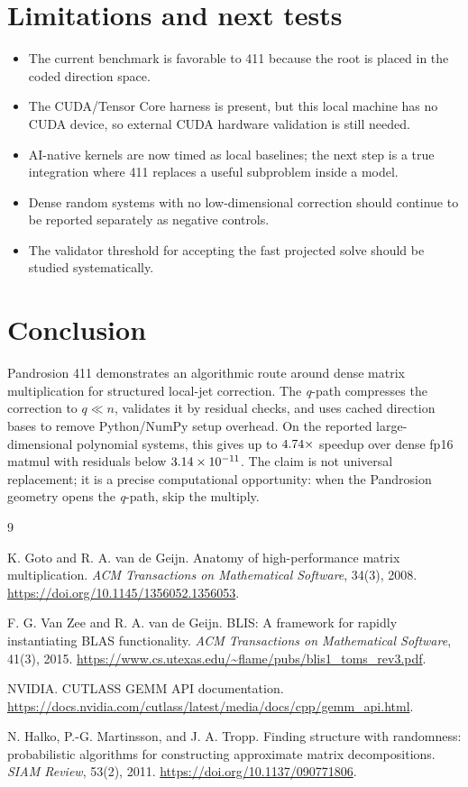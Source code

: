 \documentclass[11pt]{article}
\newcommand{\qpath}{\textit{q}\nobreakdash-path}
\begin{document}
\section{Limitations and next tests}

\begin{itemize}[leftmargin=1.2em]
\item The current benchmark is favorable to 411 because the root is placed in
the coded direction space.
\item The CUDA/Tensor Core harness is present, but this local machine has no
CUDA device, so external CUDA hardware validation is still needed.
\item AI-native kernels are now timed as local baselines; the next step is a
true integration where 411 replaces a useful subproblem inside a model.
\item Dense random systems with no low-dimensional correction should continue
to be reported separately as negative controls.
\item The validator threshold for accepting the fast projected solve should be
studied systematically.
\end{itemize}

\section{Conclusion}

Pandrosion 411 demonstrates an algorithmic route around dense matrix
multiplication for structured local-jet correction.  The \qpath{} compresses the
correction to \(q\ll n\), validates it by residual checks, and uses cached
direction bases to remove Python/NumPy setup overhead.  On the reported
large-dimensional polynomial systems, this gives up to
\(4.74\times\) speedup over dense fp16 matmul with residuals
below \(3.14\times 10^{-11}\).  The claim is not universal replacement; it is a
precise computational opportunity: when the Pandrosion geometry opens the
\qpath, skip the multiply.

\begin{thebibliography}{9}

K. Goto and R. A. van de Geijn.
\newblock Anatomy of high-performance matrix multiplication.
\newblock \emph{ACM Transactions on Mathematical Software}, 34(3), 2008.
\newblock \url{https://doi.org/10.1145/1356052.1356053}.

F. G. Van Zee and R. A. van de Geijn.
\newblock BLIS: A framework for rapidly instantiating BLAS functionality.
\newblock \emph{ACM Transactions on Mathematical Software}, 41(3), 2015.
\newblock \url{https://www.cs.utexas.edu/~flame/pubs/blis1_toms_rev3.pdf}.

NVIDIA.
\newblock CUTLASS GEMM API documentation.
\newblock \url{https://docs.nvidia.com/cutlass/latest/media/docs/cpp/gemm_api.html}.

N. Halko, P.-G. Martinsson, and J. A. Tropp.
\newblock Finding structure with randomness: probabilistic algorithms for
constructing approximate matrix decompositions.
\newblock \emph{SIAM Review}, 53(2), 2011.
\newblock \url{https://doi.org/10.1137/090771806}.

\end{thebibliography}
\end{document}
